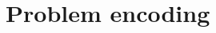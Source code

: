 \renewcommand*\chappic{img/encoding.pdf}
\renewcommand*\chapquote{What idiot called them logic errors rather than bool shit?}  %
\renewcommand*\chapquotesrc{Unknown}
\chapter{Problem encoding}
\label{ch:enc}
\vspace{50pt}
